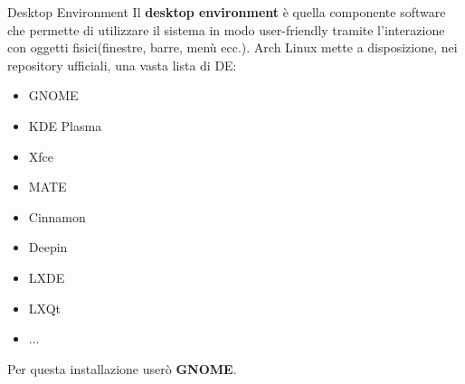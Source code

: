 
\begin{frame}{Desktop Environment}
Il \textbf{desktop environment} è quella componente software che permette di utilizzare il sistema in modo user-friendly
tramite l'interazione con oggetti fisici(finestre, barre, menù ecc.). Arch Linux mette a disposizione, nei repository ufficiali,
una vasta lista di DE:
\begin{itemize}
    \item GNOME
    \item KDE Plasma
    \item Xfce
    \item MATE
    \item Cinnamon
    \item Deepin
    \item LXDE
    \item LXQt
    \item ...
\end{itemize}
Per questa installazione userò \textbf{GNOME}.
\end{frame}

